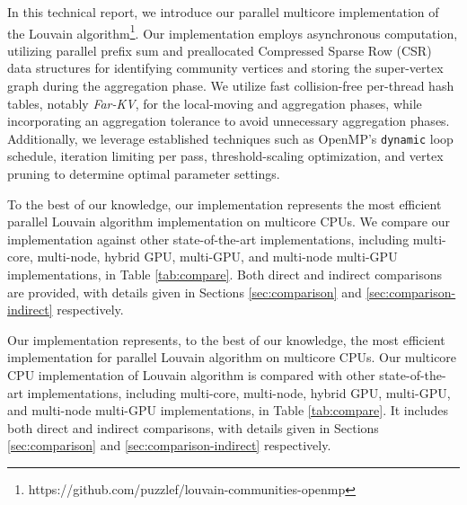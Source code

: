 In this technical report, we introduce our parallel multicore implementation of the Louvain algorithm\footnote{https://github.com/puzzlef/louvain-communities-openmp}. Our implementation employs asynchronous computation, utilizing parallel prefix sum and preallocated Compressed Sparse Row (CSR) data structures for identifying community vertices and storing the super-vertex graph during the aggregation phase. We utilize fast collision-free per-thread hash tables, notably \textit{Far-KV}, for the local-moving and aggregation phases, while incorporating an aggregation tolerance to avoid unnecessary aggregation phases. Additionally, we leverage established techniques such as OpenMP's \verb|dynamic| loop schedule, iteration limiting per pass, threshold-scaling optimization, and vertex pruning to determine optimal parameter settings.

To the best of our knowledge, our implementation represents the most efficient parallel Louvain algorithm implementation on multicore CPUs. We compare our implementation against other state-of-the-art implementations, including multi-core, multi-node, hybrid GPU, multi-GPU, and multi-node multi-GPU implementations, in Table \ref{tab:compare}. Both direct and indirect comparisons are provided, with details given in Sections \ref{sec:comparison} and \ref{sec:comparison-indirect} respectively.


Our implementation represents, to the best of our knowledge, the most efficient implementation for parallel Louvain algorithm on multicore CPUs. Our multicore CPU implementation of Louvain algorithm is compared with other state-of-the-art implementations, including multi-core, multi-node, hybrid GPU, multi-GPU, and multi-node multi-GPU implementations, in Table \ref{tab:compare}. It includes both direct and indirect comparisons, with details given in Sections \ref{sec:comparison} and \ref{sec:comparison-indirect} respectively.

